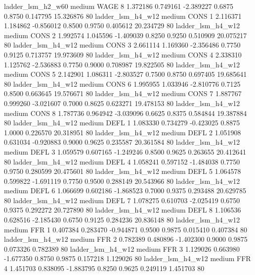      ladder_lsm_h2_w60     medium     WAGE                 8  1.372186 0.749161 -2.389227 0.6875 0.8750  0.147795   15.326876 80
     ladder_lsm_h4_w12     medium     CONS                 1  2.116371 1.184862 -0.856012 0.8500 0.9750  0.405612   20.234729 80
     ladder_lsm_h4_w12     medium     CONS                 2  1.992574 1.045596 -1.409039 0.8250 0.9250  0.510909   20.075217 80
     ladder_lsm_h4_w12     medium     CONS                 3  2.661114 1.169360 -2.356486 0.7750 0.9125  0.713757   19.973609 80
     ladder_lsm_h4_w12     medium     CONS                 4  2.338310 1.125762 -2.536883 0.7750 0.9000  0.708987   19.822505 80
     ladder_lsm_h4_w12     medium     CONS                 5  2.142901 1.086311 -2.803527 0.7500 0.8750  0.697405   19.685641 80
     ladder_lsm_h4_w12     medium     CONS                 6  1.995955 1.033946 -2.810776 0.7125 0.8500  0.663645   19.576671 80
     ladder_lsm_h4_w12     medium     CONS                 7  1.887767 0.999260 -3.021607 0.7000 0.8625  0.623271   19.478153 80
     ladder_lsm_h4_w12     medium     CONS                 8  1.787736 0.964942 -3.039096 0.6625 0.8375  0.584844   19.387884 80
     ladder_lsm_h4_w12     medium     DEFL                 1  1.083330 0.734279 -0.423025 0.8875 1.0000  0.226570   20.318951 80
     ladder_lsm_h4_w12     medium     DEFL                 2  1.051908 0.631034 -0.920883 0.9000 0.9625  0.235587   20.361584 80
     ladder_lsm_h4_w12     medium     DEFL                 3  1.059579 0.607165 -1.249246 0.8500 0.9625  0.263655   20.412641 80
     ladder_lsm_h4_w12     medium     DEFL                 4  1.058241 0.597152 -1.484038 0.7750 0.9750  0.280599   20.475601 80
     ladder_lsm_h4_w12     medium     DEFL                 5  1.064578 0.599822 -1.691119 0.7750 0.9500  0.288149   20.543966 80
     ladder_lsm_h4_w12     medium     DEFL                 6  1.066699 0.602186 -1.868523 0.7000 0.9375  0.293488   20.629785 80
     ladder_lsm_h4_w12     medium     DEFL                 7  1.078275 0.610703 -2.025419 0.6750 0.9375  0.292272   20.727890 80
     ladder_lsm_h4_w12     medium     DEFL                 8  1.106536 0.628516 -2.185430 0.6750 0.9125  0.284236   20.836148 80
     ladder_lsm_h4_w12     medium      FFR                 1  0.407384 0.283470 -0.944871 0.9500 0.9875  0.015410    0.407384 80
     ladder_lsm_h4_w12     medium      FFR                 2  0.782389 0.480896 -1.402300 0.9000 0.9875  0.073326    0.782389 80
     ladder_lsm_h4_w12     medium      FFR                 3  1.129026 0.663980 -1.677350 0.8750 0.9875  0.157218    1.129026 80
     ladder_lsm_h4_w12     medium      FFR                 4  1.451703 0.838095 -1.883795 0.8250 0.9625  0.249119    1.451703 80

